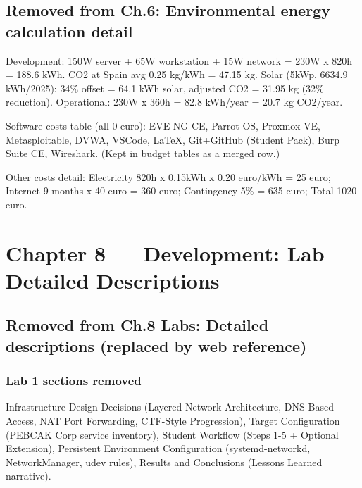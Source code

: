 \documentclass[a4paper,11pt]{article}
\begin{document}
\subsection{Removed from Ch.6: Environmental energy calculation detail}


Development: 150W server + 65W workstation + 15W network = 230W x 820h = 188.6 kWh.
CO2 at Spain avg 0.25 kg/kWh = 47.15 kg. Solar (5kWp, 6634.9 kWh/2025):
34\% offset = 64.1 kWh solar, adjusted CO2 = 31.95 kg (32\% reduction).
Operational: 230W x 360h = 82.8 kWh/year = 20.7 kg CO2/year.

Software costs table (all 0 euro): EVE-NG CE, Parrot OS, Proxmox VE,
Metasploitable, DVWA, VSCode, LaTeX, Git+GitHub (Student Pack), Burp Suite CE,
Wireshark. (Kept in budget tables as a merged row.)

Other costs detail: Electricity 820h x 0.15kWh x 0.20 euro/kWh = 25 euro;
Internet 9 months x 40 euro = 360 euro; Contingency 5\% = 635 euro; Total 1020 euro.

\section{Chapter 8 --- Development: Lab Detailed Descriptions}

\subsection{Removed from Ch.8 Labs: Detailed descriptions (replaced by web reference)}


\subsubsection{Lab 1 sections removed}
Infrastructure Design Decisions (Layered Network Architecture, DNS-Based Access,
NAT Port Forwarding, CTF-Style Progression), Target Configuration (PEBCAK Corp
service inventory), Student Workflow (Steps 1-5 + Optional Extension),
Persistent Environment Configuration (systemd-networkd, NetworkManager, udev rules),
Results and Conclusions (Lessons Learned narrative).
\end{document}
